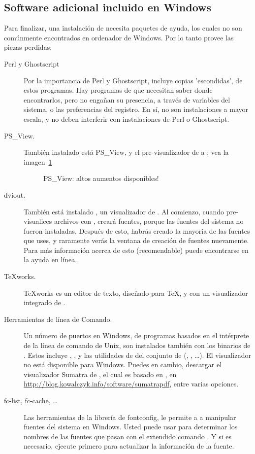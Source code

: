 \documentclass{article}
\begin{document}
\subsection{Software adicional incluido en Windows}
Para finalizar, una instalación de \TL{} necesita paquetes de ayuda, los cuales no
son comúnmente encontrados en ordenador de Windows. Por lo tanto \TL{} provee las
piezas perdidas:
\begin{description}
	\item[Perl y Ghostscript] Por la importancia de Perl y Ghostscript, \TL{}
		incluye copias 'escondidas', de estos programas. Hay programas de
		\TL{} que necesitan saber donde encontrarlos, pero no engañan su
		presencia, a través de variables del
		sistema, o las preferencias
		del registro. En sí, no son instalaciones a mayor escala, y no
		deben interferir con instalaciones de Perl o Ghostscript. 

	\item[PS\_View.] También instalado está PS\_View, y el
		pre-visualizador de \PS{} a ; vea la
		imagen~\ref{fig:psview}

\begin{figure}[tb]
\caption{PS\_View: altos aumentos disponibles!}\label{fig:psview}
\end{figure}

\item[dviout.] También está instalado , un visualizador de
	. Al comienzo, cuando pre-visualices archivos con
	, creará fuentes, porque las fuentes del sistema
	no fueron instaladas. Después de esto, habrás creado la mayoría de
	las fuentes que uses, y raramente verás la ventana de creación de
	fuentes nuevamente. Para más información acerca de esto
	(recomendable) puede encontrarse en la ayuda en línea. 

\item[\TeX{}works.] \TeX{}works es un editor de texto, diseñado para
	\TeX{}, y con un visualizador integrado de .

\item[Herramientas de línea de Comando.] Un número de puertos en
	Windows, de programas basados en el intérprete de la
	línea de comando de Unix, son instalados también con
	los binarios de \TL{}. Estos incluye ,
	, y las utilidades de del conjunto de
	 (, ,
	\ldots).  El visualizador  no está
	disponible para Windows.  Puedes en cambio, descargar
	el visualizador Sumatra de , el cual es
	basado en , en
	\url{http://blog.kowalczyk.info/software/sumatrapdf},
	entre varias opciones.
	
\item[fc-list, fc-cache, \ldots] Las herramientas de la librería de
	fontconfig, le permite a \XeTeX{} a manipular fuentes del sistema
	en Windows. Usted puede usar  para determinar los
	nombres de las fuentes que pasan con el extendido comando
	. Y si es necesario, ejecute  primero para
	actualizar la información de la fuente.

\end{description}
\end{document}
